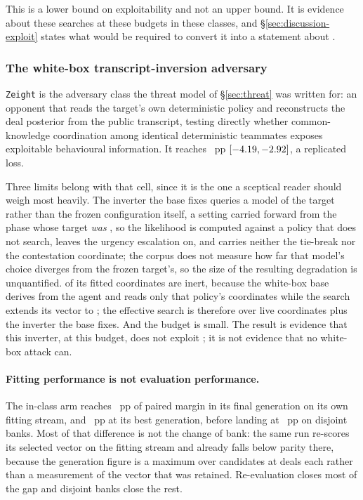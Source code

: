 This is a lower bound on exploitability and not an upper bound. It is evidence about these searches
at these budgets in these classes, and \S\ref{sec:discussion-exploit} states what would be required
to convert it into a statement about \sestina{}.

\subsubsection{The white-box transcript-inversion adversary}
\label{sec:results-whitebox}

\texttt{Zeight} is the adversary class the threat model of \S\ref{sec:threat} was written for: an
opponent that reads the target's own deterministic policy and reconstructs the deal posterior from
the public transcript, testing directly whether common-knowledge coordination among identical
deterministic teammates exposes exploitable behavioural information. It reaches
\vsevenZeightEdge{}~pp $[-4.19, -2.92]$, a replicated loss.

Three limits belong with that cell, since it is the one a sceptical reader should weigh most
heavily. The inverter the base fixes queries a \vsix{} model of the target rather than the frozen
configuration itself, a setting carried forward from the phase whose target \emph{was} \vsix{}, so
the likelihood is computed against a policy that does not search, leaves the urgency escalation on,
and carries neither the tie-break nor the contestation coordinate; the corpus does not measure how
far that model's choice diverges from the frozen target's, so the size of the resulting degradation
is unquantified. \vsevenZeightInert{} of its fitted coordinates are inert, because the white-box base derives from the
\vsix{} agent and reads only that policy's \vsevenVsixCoords{} coordinates while the search extends
its vector to \vsevenCoordinates{}; the effective search is therefore over \vsevenZeightLive{} live
coordinates plus the inverter the base fixes. And the budget is small. The result is evidence that
this inverter, at this budget, does not exploit \sestina{}; it is not evidence that no white-box
attack can.

\paragraph{Fitting performance is not evaluation performance.} The in-class arm reaches
\vsevenZoneFitMargin{}~pp of paired margin in its final generation on its own fitting stream, and
\vsevenZoneFitPeak{}~pp at its best generation, before landing at \vsevenZoneEdge{}~pp on disjoint
banks. Most of that difference is not the change of bank: the same run re-scores its selected vector
on the fitting stream and already falls below parity there, because the generation figure is a
maximum over candidates at \vsevenBfourDeals{} deals each rather than a measurement of the vector
that was retained. Re-evaluation closes most of the gap and disjoint banks close the rest.

